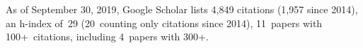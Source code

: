 As of September 30, 2019, Google Scholar lists
4,849 citations (1,957 since 2014),
an h-index of~29 (20~counting only citations since 2014),
11~papers with 100+~citations, including 4~papers with 300+.
